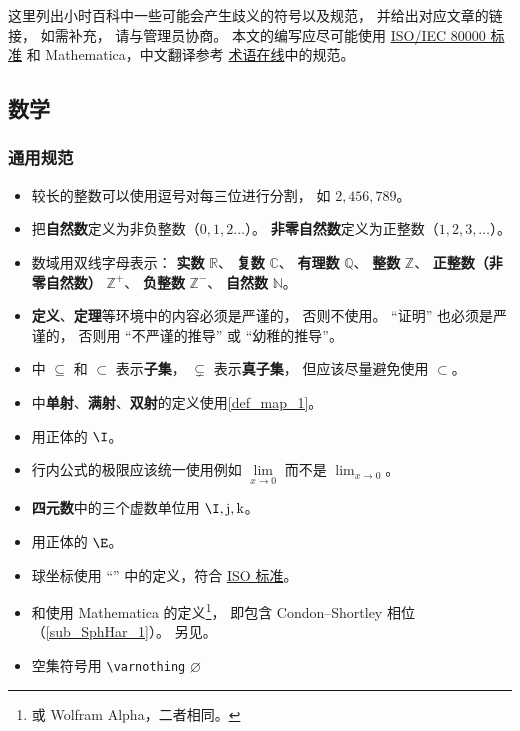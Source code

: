 
这里列出小时百科中一些可能会产生歧义的符号以及规范， 并给出对应文章的链接， 如需补充， 请与管理员协商。 本文的编写应尽可能使用 \href{https://en.wikipedia.org/wiki/ISO/IEC_80000}{ISO/IEC 80000 标准} 和 Mathematica，中文翻译参考 \href{https://www.termonline.cn/about}{术语在线}中的规范。

\subsection{数学}
\subsubsection{通用规范}
\begin{itemize}
\item 较长的整数可以使用逗号对每三位进行分割， 如 $2,456,789$。
\item 把\textbf{自然数}定义为非负整数（$0,1,2\dots$）。 \textbf{非零自然数}定义为正整数（$1,2,3,\dots$）。
\item 数域用双线字母表示： \textbf{实数} $\mathbb R$、 \textbf{复数} $\mathbb C$、 \textbf{有理数} $\mathbb Q$、 \textbf{整数} $\mathbb Z$、 \textbf{正整数（非零自然数）} $\mathbb Z^+$、 \textbf{负整数} $\mathbb Z^-$、 \textbf{自然数} $\mathbb N$。%
\item \textbf{定义}、\textbf{定理}等环境中的内容必须是严谨的， 否则不使用。 “证明” 也必须是严谨的， 否则用 “不严谨的推导” 或 “幼稚的推导”。
\item {}中 $\subseteq$ 和 $\subset$ 表示\textbf{子集}， $\subsetneq$ 表示\textbf{真子集}， 但应该尽量避免使用 $\subset$。
\item {}中\textbf{单射}、\textbf{满射}、\textbf{双射}的定义使用\autoref{def_map_1}。
\item {} 用正体的 $\I$。
\item 行内公式的极限应该统一使用例如 $\lim\limits_{x\to 0}$ 而不是 $\lim_{x\to 0}$。 %
\item \textbf{四元数}中的三个虚数单位用 $\I, \mathrm{j}, \mathrm{k}$。
\item {} 用正体的 $\E$。
\item 球坐标使用 “” 中的定义，符合 \href{https://www.iso.org/standard/64973.html}{ISO 标准}。
\item {}和使用 Mathematica 的定义\footnote{或 Wolfram Alpha，二者相同。}， 即包含 Condon–Shortley 相位（\autoref{sub_SphHar_1}）。 另见。
\item 空集符号用 \verb`\varnothing` $\varnothing$
\end{itemize}

